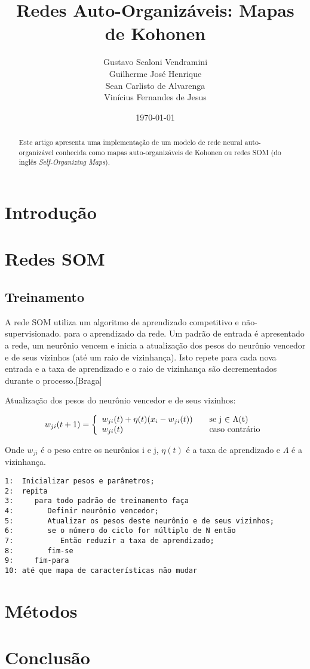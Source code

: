 \documentclass[a4paper]{article}
\title{Redes Auto-Organizáveis: Mapas de Kohonen}
\author{Gustavo Scaloni Vendramini    \\ 
        Guilherme José Henrique       \\
        Sean Carlisto de Alvarenga    \\
        Vinícius Fernandes de Jesus}
\date{\today}
\begin{document}
\maketitle

\begin{abstract}
Este artigo apresenta uma implementação de um modelo de rede neural auto-organizável conhecida como mapas auto-organizáveis de Kohonen ou redes SOM (do inglês \textit{Self-Organizing Maps}).
\end{abstract}

\section{Introdução}\label{introducao}

\section{Redes SOM}\label{som}

\subsection{Treinamento}\label{treinamento}
A rede SOM utiliza um algoritmo de aprendizado competitivo e não-supervisionado. para o aprendizado da rede. Um padrão de entrada é apresentado a rede, um neurônio vencem e inicia a atualização dos pesos do neurônio vencedor e de seus vizinhos (até um raio de vizinhança). Isto repete para cada nova entrada e a taxa de aprendizado e o raio de vizinhança são decrementados durante o processo.[Braga]

Atualização dos pesos do neurônio vencedor e de seus vizinhos:

\[ w_{ji}(t+1) = \left\{ 
  \begin{array}{l l}
    w_{ji}(t) + \eta(t)(x_{i}- w_{ji}(t)) & \quad \text{se j $\in$ $\Lambda$(t)}\\
    w_{ji}(t) & \quad \text{caso contrário}
  \end{array} \right.\]

Onde $w_{ji}$ é o peso entre os neurônios i e j, $\eta(t)$ é a taxa de aprendizado e $\Lambda$ é a vizinhança.

\begin{verbatim}
1:  Inicializar pesos e parâmetros;
2:  repita
3:     para todo padrão de treinamento faça
4:        Definir neurônio vencedor;
5:        Atualizar os pesos deste neurônio e de seus vizinhos;
6:        se o número do ciclo for múltiplo de N então
7:           Então reduzir a taxa de aprendizado;
8:        fim-se
9:     fim-para
10: até que mapa de características não mudar
\end{verbatim}

\section{Métodos}\label{metodos}





\section{Conclusão}\label{conclusao}




\end{document}
